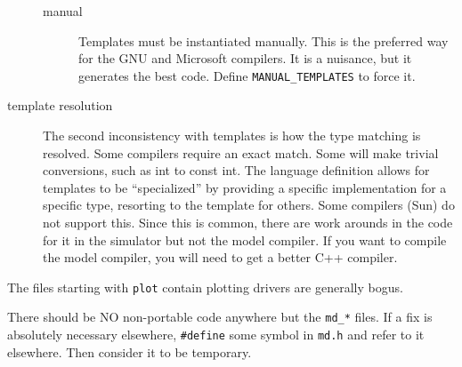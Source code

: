 \begin{description}
\begin{description}
\item[manual] Templates must be instantiated manually.  This is
the preferred way for the GNU and Microsoft compilers.  It is a
nuisance, but it generates the best code.  Define {\tt MANUAL\_TEMPLATES} to
force it.

\end{description}

\item[template resolution] The second inconsistency with templates
is how the type matching is resolved.  Some compilers require an exact
match.  Some will make trivial conversions, such as int to const int.
The language definition allows for templates to be ``specialized'' by
providing a specific implementation for a specific type, resorting to
the template for others.  Some compilers (Sun) do not support this.
Since this is common, there are work arounds in the code for it in the
simulator but not the model compiler.  If you want to compile the
model compiler, you will need to get a better C++ compiler.

\end{description}

The files starting with {\tt plot} contain plotting drivers are
generally bogus.

There should be NO non-portable code anywhere but the {\tt md\_*}
files.  If a fix is absolutely necessary elsewhere, {\tt \#define} some
symbol in {\tt md.h} and refer to it elsewhere.  Then consider it to
be temporary.

